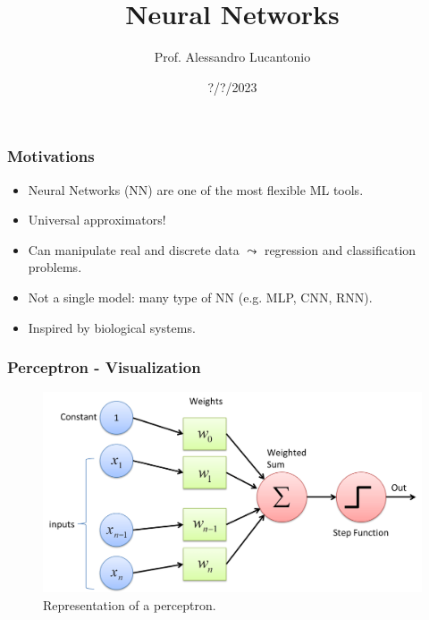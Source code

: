 \documentclass{beamer}
\title{Neural Networks}
\author{Prof. Alessandro Lucantonio}
\institute{Aarhus University - Department of Mechanical and Production Engineering}
\date{?/?/2023}
\begin{document}
	\frame{\titlepage}
	
	\begin{frame}
		\frametitle{Motivations}
		\begin{itemize}
			\setlength\itemsep{5mm}
			\item Neural Networks (NN) are one of the most flexible ML tools.
			\item Universal approximators!
			\item Can manipulate real and discrete data $\leadsto$ regression and classification problems.
			\item Not a single model: many type of NN (e.g. MLP, CNN, RNN).
			\item Inspired by biological systems.
		\end{itemize}
	\end{frame}

	\begin{frame}
		\frametitle{Perceptron - Visualization}
		\begin{figure}
			\centering
			\includegraphics[scale=0.2]{images/perceptron}
			\caption{Representation of a perceptron.}
		\end{figure}
	\end{frame}
\end{document}
